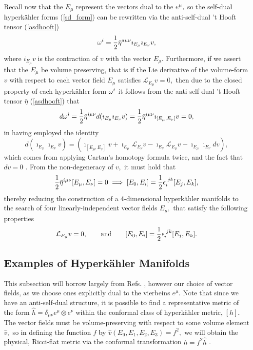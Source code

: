\documentclass[a4paper,12pt, onecolumn, notitlepage]{article}
\theoremstyle{definition}
\theoremstyle{remark}
\newcommand{\w}{\omega}
\newcommand{\m}{\mu}
\newcommand{\n}{\nu}
\newcommand{\e}{\epsilon}
\newcommand{\HK}{hyperk\"ahler }
\begin{document}
Recall now that the $E_{\m}$ represent the vectors dual to the $e\indices{^\m},$ so the self-dual \HK forms (\ref{sd_form}) can be rewritten via the anti-self-dual 't Hooft tensor (\ref{asdhooft}) \cite{hashimoto_1997}
\begin{equation*}
\w^{i} = \frac{1}{2}\bar{\eta}\indices{^a^\m^\n}\imath_{E_{\m}}\imath_{E_{\n}}v,
\end{equation*}
where $i_{E_{\m}}v$ is the contraction of $v$ with the vector $E_{\m}.$ Furthermore, if we assert that the $E_{\m}$ be volume preserving, that is if the Lie derivative of the volume-form $v$ with respect to each vector field $E_{\m}$ satisfies $\mathcal{L}_{E_{\m}}v = 0,$ then due to the closed property of each \HK form $\w\indices{^i}$ it follows from the anti-self-dual 't Hooft tensor $\bar{\eta}$ (\ref{asdhooft}) that
\begin{align*}
	d\w^{i} = \frac{1}{2}\bar{\eta}\indices{^i^\m^\n}d(\imath_{E_{\m}}\imath_{E_{\n}}v) = \frac{1}{2}\bar{\eta}\indices{^i^\m^\n}\imath_{[E_{\m},E_{\n}]}v=0,
\end{align*}
in having employed the identity
\begin{equation*}
	\label{cartan}
	d(\imath_{E_{\m}}\imath_{E_{\n}}v)=(\imath_{[E_{\m},E_{\n}]}v + \imath_{E_{\m}}\mathcal{L}_{E_{\n}}v - \imath_{E_{\n}}\mathcal{L}_{E_{\m}}v + \imath_{E_{\m}}\imath_{E_{\n}}dv),
\end{equation*}
which comes from applying Cartan's homotopy formula twice, and the fact that $dv=0$ \cite{donaldson}. From the non-degeneracy of $v,$ it must hold that
\begin{equation}
	\label{half_flat}
	\frac{1}{2}\bar{\eta}\indices{^i^\m^\n}[E_{\m},E_{\n}] = 0 \implies [E_{0},E_{i}]=\frac{1}{2}\e\indices{_i^j^k}[E_{j},E_{k}],
\end{equation}
thereby reducing the construction of a 4-dimensional \HK manifolds to the search of four linearly-independent vector fields $E_{\m},$ that satisfy the following properties \cite{hashimoto_1997}
\begin{gather}
	\label{asj}
	\mathcal{L}_{E_{\m}}v = 0,\qquad \text{and}\qquad [E_{0},E_{i}]=\frac{1}{2}\e\indices{_i^j^k}[E_{j},E_{k}].
\end{gather}

\subsection{Examples of Hyperk\"ahler Manifolds}
This subsection will borrow largely from Refs. \cite{ootsuka_1998,joyce_1995}, however our choice of vector fields, as we choose ones explicitly dual to the vierbeins $e^{\m}$. Note that since we have an anti-self-dual structure, it is possible to find a representative metric of the form $\hat{h}=\delta_{\m\n}e^{\m}\otimes e^{\n}$ within the conformal class of \HK metric, $[h]$. The vector fields must be volume-preserving with respect to some volume element $\hat{v},$ so in defining the function $f$ by $\hat{v}(E_{0},E_{1},E_{2},E_{3}) = f^{2},$ we will obtain the physical, Ricci-flat metric via the conformal transformation $h=f^{2}\hat{h}$ \cite{grant_1997}.\\
\end{document}
